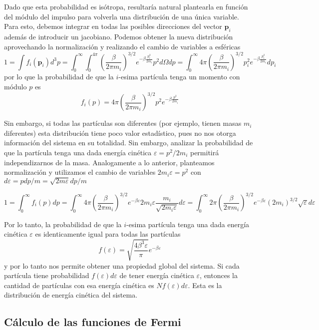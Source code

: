Dado que esta probabilidad es isótropa, resultaría natural plantearla en función del módulo del impulso para volverla una distribución de una única variable.
Para esto, debemos integrar en todas las posibles direcciones del vector $\mathbf{p}_i$ además de introducir un jacobiano.
Podemos obtener la nueva distribución aprovechando la normalización y realizando el cambio de variables a esféricas
\[1 = \int f_i(\mathbf{p}_i) d^3p = \int_0^\infty\int_0^{4\pi}\left(\frac{\beta}{2\pi m_i} \right)^{3/2} e^{-\beta\frac{p_i^2}{2m_i}} p^2d\Omega dp 
= \int_0^\infty 4\pi\left(\frac{\beta}{2\pi m_i} \right)^{3/2} p_i^2 e^{-\beta\frac{p_i^2}{2m_i}} dp_i\]
por lo que la probabilidad de que la $i$-esima partícula tenga un momento con módulo $p$ es
\[ f_i(p) = 4\pi\left(\frac{\beta}{2\pi m_i} \right)^{3/2} p^2 e^{-\beta\frac{p^2}{2m_i}} \]

Sin embargo, si todas las partículas son diferentes (por ejemplo, tienen masas $m_i$ diferentes) esta distribución tiene poco valor estadístico, pues no nos otorga información
del sistema en su totalidad. 
Sin embargo, analizar la probabilidad de que la partícula tenga una dada energía cinética $\varepsilon = p^2/2m_i$ permitirá independizarnos de la masa.
Analogamente a lo anterior, planteamos normalización y utilizamos el cambio de variables $2m_i\varepsilon = p^2$ con $d\varepsilon = pdp/m = \sqrt{2m\varepsilon}dp/m$

\[ 1 = \int_0^\infty f_i(p) dp = \int_0^\infty 4\pi\left(\frac{\beta}{2\pi m_i} \right)^{3/2} e^{-\beta\varepsilon} 2m_i\varepsilon\frac{m_i}{\sqrt{2m_i\varepsilon}} d\varepsilon
= \int_0^\infty 2\pi\left(\frac{\beta}{2\pi m_i} \right)^{3/2} e^{-\beta\varepsilon} (2m_i)^{3/2}\sqrt{\varepsilon} d\varepsilon \]

Por lo tanto, la probabilidad de que la $i$-esima partícula tenga una dada energía cinética $\varepsilon$ es identicamente igual para todas las partículas
\begin{equation}
 f(\varepsilon) = \sqrt{\frac{4\beta^3\varepsilon}{\pi}}e^{-\beta\varepsilon}
\end{equation}
y por lo tanto nos permite obtener una propiedad global del sistema. 
Si cada partícula tiene probabilidad $f(\varepsilon)d\varepsilon$ de tener energía cinética $\varepsilon$, entonces la cantidad de partículas con esa energía cinética es $Nf(\varepsilon)d\varepsilon$.
Esta es la distribución de energía cinética del sistema.



\subsection{Cálculo de las funciones de Fermi}

